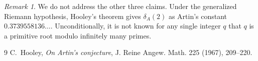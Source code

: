 \documentclass[11pt]{article}
\theoremstyle{plain}
\theoremstyle{definition}
\theoremstyle{remark}
\newtheorem{remark}[theorem]{Remark}
\begin{document}
\begin{remark}
We do not address the other three claims. Under the generalized Riemann hypothesis,
Hooley's theorem gives $\delta_A(2)$ as Artin's constant $0.3739558136\ldots$.
Unconditionally, it is not known for any single integer $q$ that $q$ is a primitive
root modulo infinitely many primes.
\end{remark}

\begin{thebibliography}{9}
 C.~Hooley, \emph{On Artin's conjecture}, J. Reine Angew. Math. 225
  (1967), 209--220.
\end{thebibliography}
\end{document}
